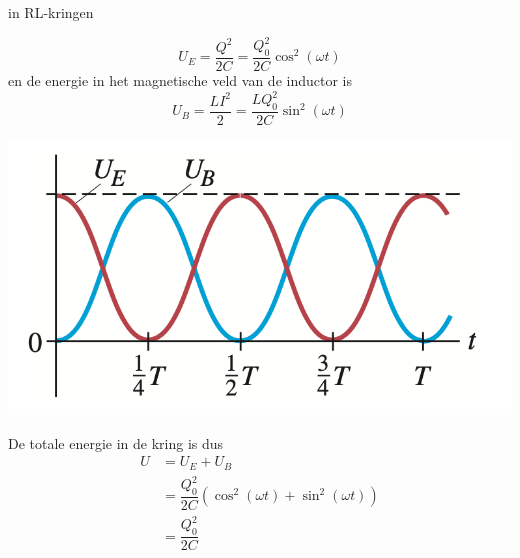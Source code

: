 \begin{app}[LC-kringen]{in RL-kringen}
    \begin{minipage}{.70\textwidth}
        \begin{equation*}
            U_{E} = \dfrac{Q^{2}}{2C} = \dfrac{Q_{0}^2}{2C}\cos^2(\omega t)
        \end{equation*}
        \hspace{-0.6cm} en de energie in het magnetische veld van de inductor is 
        \begin{equation*}
            U_{B} = \dfrac{LI^{2}}{2} = \dfrac{LQ_{0}^2}{2C}\sin^2(\omega t)
        \end{equation*}
    \end{minipage}
    \begin{minipage}{.26\textwidth}
        \vspace{0cm}\hspace{-1.4cm}\includegraphics[scale = 0.4]{Images/Magnetisme/LCKringOscillatie.png} 
    \end{minipage}
    De totale energie in de kring is dus
    \begin{align*}
        U &= U_{E} + U_{B} \\
          &= \dfrac{Q_{0}^2}{2C}\left(\cos^2(\omega t) +\sin^2(\omega t)\right) \\ 
          &= \dfrac{Q_{0}^2}{2C}
    \end{align*}
\end{app}

\newpage

